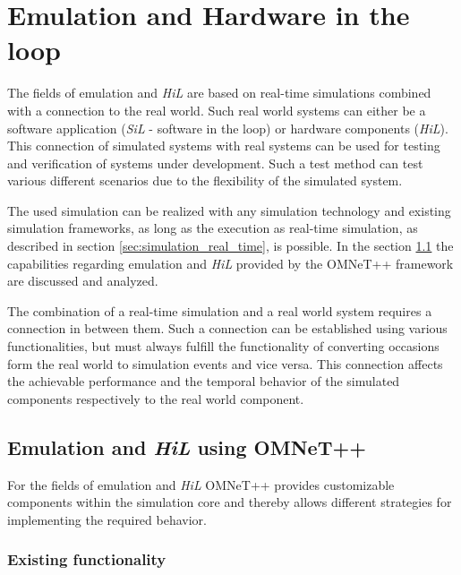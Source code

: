 \chapter{Emulation and Hardware in the loop}
\label{cha:emulation}

The fields of emulation and \emph{HiL} are based on real-time simulations combined with a connection to the real world.
Such real world systems can either be a software application (\emph{SiL} - software in the loop) or hardware components (\emph{HiL}).
This connection of simulated systems with real systems can be used for testing and verification of systems under development.
Such a test method can test various different scenarios due to the flexibility of the simulated system.
\cite[section I]{lu_low-cost_2007}

The used simulation can be realized with any simulation technology and existing simulation frameworks, as long as the execution as real-time simulation, as described in section \ref{sec:simulation_real_time}, is possible.
In the section \ref{sec:emulation_omnet} the capabilities regarding emulation and \emph{HiL} provided by the OMNeT++ framework are discussed and analyzed.

The combination of a real-time simulation and a real world system requires a connection in between them.
Such a connection can be established using various functionalities, but must always fulfill the functionality of converting occasions form the real world to simulation events and vice versa.
This connection affects the achievable performance and the temporal behavior of the simulated components respectively to the real world component.


\section{Emulation and \emph{HiL} using OMNeT++}
\label{sec:emulation_omnet}
For the fields of emulation and \emph{HiL} OMNeT++ provides customizable components within the simulation core and thereby allows different strategies for implementing the required behavior.

\subsection{Existing functionality}
\label{sec:emulation_omnet_existing}

